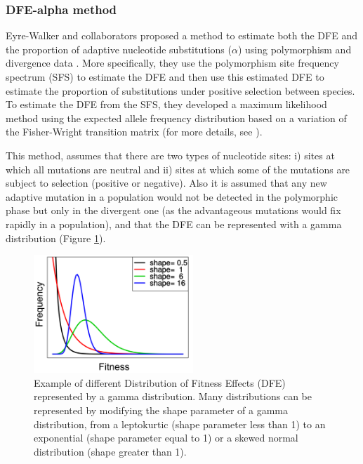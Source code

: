 \subsubsection{DFE-alpha method} \label{alpha}

Eyre-Walker and collaborators proposed a method to estimate both the DFE and the proportion of adaptive nucleotide substitutions ($\alpha$) using polymorphism and divergence data \citep{Eyre-Walker2009}.
More specifically, they use the polymorphism site frequency spectrum (SFS) to estimate the DFE and then use this estimated DFE to estimate the proportion of substitutions under positive selection between species.
%
To estimate the DFE from the SFS, they developed a maximum likelihood method using the expected allele frequency distribution based on a variation of the Fisher-Wright transition matrix (for more details, see \citealp{Keightley2007,Eyre-Walker2009}).

This method, assumes that there are two types of nucleotide sites: 
i) sites at which all mutations are neutral and ii) sites at which some of the mutations are subject to selection (positive or negative).
Also it is assumed that any new adaptive mutation in a population would not be detected in the polymorphic phase but only in the divergent one (as the advantageous mutations would fix rapidly in a population), and that the DFE can be represented with a gamma distribution (Figure \ref{fig:Gamma}).

\begin{figure}[h]
  \includegraphics[width=6cm]{./Images/Gamma_dist_2.png}
  \centering
  \caption{Example of different Distribution of Fitness Effects (DFE) represented by a gamma distribution. Many distributions can be represented by modifying the shape parameter of a gamma distribution, from a leptokurtic (shape parameter less than 1) to an exponential (shape parameter equal to 1) or a skewed normal distribution (shape  greater than 1).
   }
  \label{fig:Gamma}
\end{figure}

